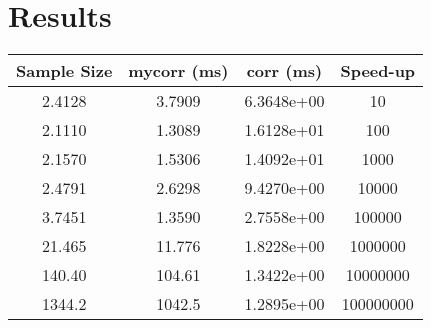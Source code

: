 \section{Results}
\begin{tabular}{|c|c|c|c|}
\hline
\textbf{Sample Size} & \textbf{mycorr (ms)} & \textbf{corr (ms)} & \textbf{Speed-up} \\
\hline

2.4128 &  3.7909 &  6.3648e+00 &  10 \\ \hline
2.1110 &  1.3089 &  1.6128e+01 &  100 \\ \hline
2.1570 &  1.5306 &  1.4092e+01 &  1000 \\ \hline
2.4791 &  2.6298 &  9.4270e+00 &  10000 \\ \hline
3.7451 &  1.3590 &  2.7558e+00 &  100000 \\ \hline
21.465 &  11.776 &  1.8228e+00 &  1000000 \\ \hline
140.40 &  104.61 &  1.3422e+00 &  10000000 \\ \hline
1344.2 &  1042.5 &  1.2895e+00 &  100000000 \\ \hline


\end{tabular}

